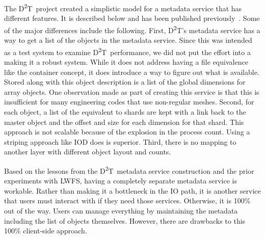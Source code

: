 \documentclass[conference]{sig-alt-gov2}
\newcommand{\DDT}{D\textsuperscript{2}T~}
\newcommand{\DDTns}{D\textsuperscript{2}T}
\begin{document}
The \DDT project created a simplistic model for a metadata service that has
different features. It is described below and has been published
previously~\cite{lofstead:2012:txn-metadata}. Some of the major differences
include the following. First, \DDTns's metadata service has a way to get a list
of the objects in the metadata service. Since this was intended as a test
system to examine \DDT performance, we did not put the effort into a making it
a robust system. While it does not address having a file equivalence like the
container concept, it does introduce a way to figure out what is available.
Stored along with this object description is a list of the global dimensions
for array objects. One observation made as part of creating this service is that
this is insufficient for many engineering codes that use non-regular meshes.
Second, for each object, a list of the equivalent to shards are kept with a
link back to the master object and the offset and size for each dimension for
that shard. This approach is not scalable because of the explosion in the
process count. Using a striping approach like IOD does is superior. Third,
there is no mapping to another layer with different object layout and counts.

Based on the lessons from the \DDT metadata service construction and the prior
experiments with LWFS, having a completely separate metadata service is
workable. Rather than making it a bottleneck in the IO path, it is another
service that users must interact with if they need those services. Otherwise,
it is 100\% out of the way. Users can manage everything by maintaining the
metadata including the list of objects themselves. However, there are drawbacks
to this 100\% client-side approach.
\end{document}
